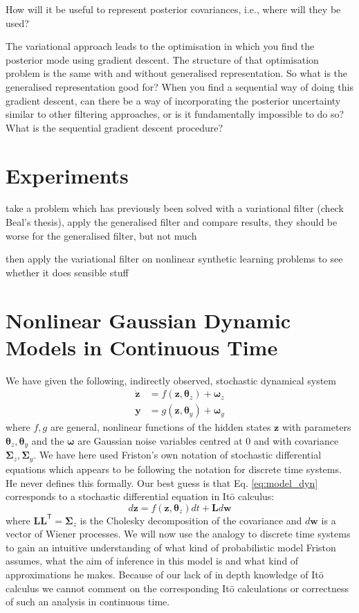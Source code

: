\documentclass[a4paper,10pt]{article}
\newcommand{\bs}[1]{\mathbf{#1}}					%
\newcommand{\bgs}[1]{\boldsymbol{#1}}				%
\newcommand{\tr}{\mathsf{T}}				%
\renewcommand{\ss}{z}         %
\newcommand{\so}{y}         %
\newcommand{\sn}{\omega} %
\renewcommand{\sp}{\theta}    %
\newcommand{\ps}{\bs{\ss}}    %
\newcommand{\po}{\bs{\so}}    %
\newcommand{\pn}{\bgs{\sn}} %
\newcommand{\pp}{\bgs{\sp}} %
\newcommand{\Cov}{\bgs{\Sigma}}			%
\begin{document}
How will it be useful to represent posterior covariances, i.e., where will they be used? 

The variational approach leads to the optimisation in which you find the posterior mode using gradient descent. The structure of that optimisation problem is the same with and without generalised representation. So what is the generalised representation good for? When you find a sequential way of doing this gradient descent, can there be a way of incorporating the posterior uncertainty similar to other filtering approaches, or is it fundamentally impossible to do so? What is the sequential gradient descent procedure?


\section{Experiments}
take a problem which has previously been solved with a variational filter (check Beal's thesis), apply the generalised filter and compare results, they should be worse for the generalised filter, but not much

then apply the variational filter on nonlinear synthetic learning problems to see whether it does sensible stuff


\section{Nonlinear Gaussian Dynamic Models in Continuous Time}
We have given the following, indirectly observed, stochastic dynamical system
\begin{align}
    \label{eq:model_dyn}\dot{\ps} &= f(\ps, \pp_{\ss}) + \pn_{\ss}\\
    \po &= g(\ps, \pp_{\so}) + \pn_{\so}
\end{align}
where $f, g$ are general, nonlinear functions of the hidden states $\ps$ with parameters $\pp_{\ss}, \pp_{\so}$ and the $\pn$ are Gaussian noise variables centred at 0 and with covariance $\Cov_{\ss}, \Cov_{\so}$. We have here used Friston's own notation of stochastic differential equations which appears to be following the notation for discrete time systems. He never defines this formally. Our best guess is that Eq. \ref{eq:model_dyn} corresponds to a stochastic differential equation in It\={o} calculus:
\[
    d\ps = f(\ps, \pp_{\ss})dt + \bs{L}d\bs{w}
\]
where $\bs{L}\bs{L}^\tr = \Cov_{\ss}$ is the Cholesky decomposition of the covariance and $d\bs{w}$ is a vector of Wiener processes. We will now use the analogy to discrete time systems to gain an intuitive understanding of what kind of probabilistic model Friston assumes, what the aim of inference in this model is and what kind of approximations he makes. Because of our lack of in depth knowledge of It\={o} calculus we cannot comment on the corresponding It\={o} calculations or correctness of such an analysis in continuous time.
\end{document}
